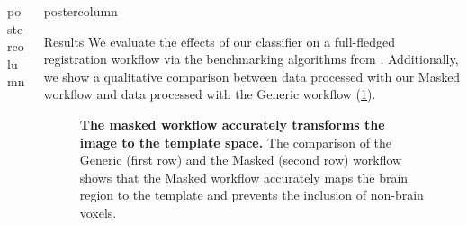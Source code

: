 \begin{frame}
\begin{columns}
\begin{column}{.42\textwidth}
\begin{beamercolorbox}[center]{postercolumn}
\begin{minipage}{.98\textwidth}
{                        }

                    \end{minipage}
                \end{beamercolorbox}
            \end{column}
            \begin{column}{.59\textwidth}
                \begin{beamercolorbox}[center]{postercolumn}
                    \begin{minipage}{.95\textwidth} %
                        \parbox[t][\columnheight]{\textwidth}{ %


                            \begin{myblock}{Results}
                                We evaluate the effects of our classifier on a full-fledged registration workflow via the benchmarking algorithms from \cite{irsabi}.
                                Additionally, we show a qualitative comparison between data processed with our Masked workflow and data processed with the Generic workflow (\cref{reg_comp}).
                                \begin{figure}
                                    \centering
                                    \caption{
                                        \textbf{The masked workflow accurately transforms the image to the template space.}
                                        The comparison of the Generic (first row) and the Masked (second row) workflow shows that the Masked workflow accurately maps the brain region to the template and prevents the inclusion of non-brain voxels.
                                    }
                                    \label{reg_comp}
                                \end{figure}



\end{myblock}}
\end{minipage}
\end{beamercolorbox}
\end{column}
\end{columns}
\end{frame}
